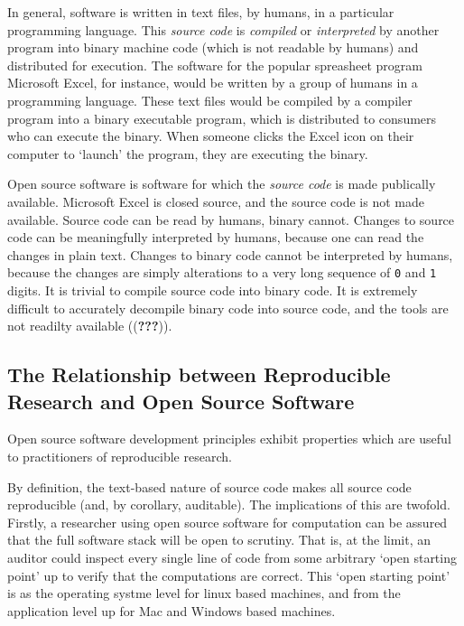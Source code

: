 \documentclass[11pt,preprint, authoryear]{elsarticle}
\numberwithin{equation}{section}
\numberwithin{figure}{section}
\numberwithin{table}{section}
\begin{document}
In general, software is written in text files, by humans, in a
particular programming language. This \emph{source code} is
\emph{compiled} or \emph{interpreted} by another program into binary
machine code (which is not readable by humans) and distributed for
execution. The software for the popular spreasheet program Microsoft
Excel, for instance, would be written by a group of humans in a
programming language. These text files would be compiled by a compiler
program into a binary executable program, which is distributed to
consumers who can execute the binary. When someone clicks the Excel icon
on their computer to `launch' the program, they are executing the
binary.

Open source software is software for which the \emph{source code} is
made publically available. Microsoft Excel is closed source, and the
source code is not made available. Source code can be read by humans,
binary cannot. Changes to source code can be meaningfully interpreted by
humans, because one can read the changes in plain text. Changes to
binary code cannot be interpreted by humans, because the changes are
simply alterations to a very long sequence of \texttt{0} and \texttt{1}
digits. It is trivial to compile source code into binary code. It is
extremely difficult to accurately decompile binary code into source
code, and the tools are not readilty available (({\textbf{???}})).

\subsection{The Relationship between Reproducible Research and Open
Source
Software}\label{the-relationship-between-reproducible-research-and-open-source-software}

Open source software development principles exhibit properties which are
useful to practitioners of reproducible research.

By definition, the text-based nature of source code makes all source
code reproducible (and, by corollary, auditable). The implications of
this are twofold. Firstly, a researcher using open source software for
computation can be assured that the full software stack will be open to
scrutiny. That is, at the limit, an auditor could inspect every single
line of code from some arbitrary `open starting point' up to verify that
the computations are correct. This `open starting point' is as the
operating systme level for linux based machines, and from the
application level up for Mac and Windows based machines.
\end{document}
